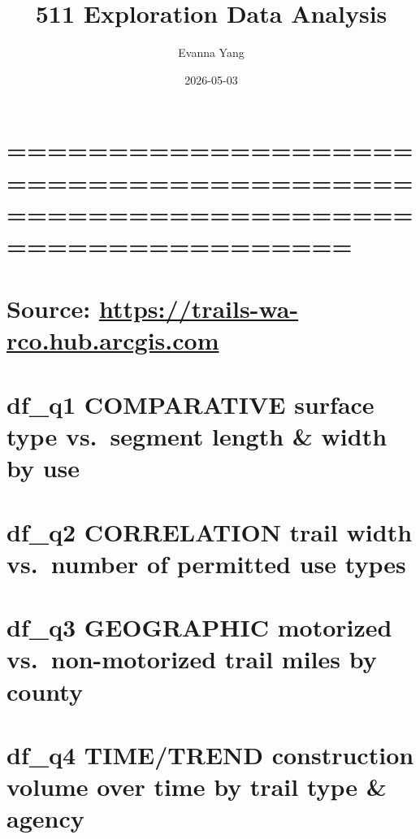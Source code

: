 \documentclass[
]{article}
\title{511 Exploration Data Analysis}
\author{Evanna Yang}
\date{2026-05-03}
\begin{document}
\maketitle

\section{=============================================================================}\label{section}

\section{\texorpdfstring{Source:
\url{https://trails-wa-rco.hub.arcgis.com}}{Source: https://trails-wa-rco.hub.arcgis.com}}\label{source-httpstrails-wa-rco.hub.arcgis.com}

\section{df\_q1 \textbar{} COMPARATIVE \textbar{} surface type
vs.~segment length \& width by
use}\label{df_q1-comparative-surface-type-vs.-segment-length-width-by-use}

\section{df\_q2 \textbar{} CORRELATION \textbar{} trail width vs.~number
of permitted use
types}\label{df_q2-correlation-trail-width-vs.-number-of-permitted-use-types}

\section{df\_q3 \textbar{} GEOGRAPHIC \textbar{} motorized
vs.~non-motorized trail miles by
county}\label{df_q3-geographic-motorized-vs.-non-motorized-trail-miles-by-county}

\section{df\_q4 \textbar{} TIME/TREND \textbar{} construction volume
over time by trail type \&
agency}\label{df_q4-timetrend-construction-volume-over-time-by-trail-type-agency}

\section{}\label{section-1}
\end{document}
